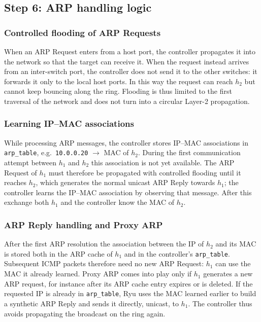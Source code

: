 \documentclass[11pt,a4paper]{article}
\newcommand{\code}[1]{\texttt{#1}}
\begin{document}
\subsection{Step 6: ARP handling logic}
\subsubsection{Controlled flooding of ARP Requests}
When an ARP Request enters from a host port, the controller propagates it into
the network so that the target can receive it. When the request instead arrives
from an inter-switch port, the controller does not send it to the other
switches: it forwards it only to the local host ports. In this way the request
can reach $h_2$ but cannot keep bouncing along the ring. Flooding is thus
limited to the first traversal of the network and does not turn into a circular
Layer-2 propagation.

\subsubsection{Learning IP--MAC associations}
While processing ARP messages, the controller stores IP--MAC associations in
\code{arp\_table}, e.g.\ \code{10.0.0.20} $\to$ MAC of $h_2$. During the first
communication attempt between $h_1$ and $h_2$ this association is not yet
available. The ARP Request of $h_1$ must therefore be propagated with controlled
flooding until it reaches $h_2$, which generates the normal unicast ARP Reply
towards $h_1$; the controller learns the IP--MAC association by observing that
message. After this exchange both $h_1$ and the controller know the MAC of
$h_2$.

\subsubsection{ARP Reply handling and Proxy ARP}
After the first ARP resolution the association between the IP of $h_2$ and its
MAC is stored both in the ARP cache of $h_1$ and in the controller's
\code{arp\_table}. Subsequent ICMP packets therefore need no new ARP Request:
$h_1$ can use the MAC it already learned. Proxy ARP comes into play only if
$h_1$ generates a new ARP request, for instance after its ARP cache entry
expires or is deleted. If the requested IP is already in \code{arp\_table}, Ryu
uses the MAC learned earlier to build a synthetic ARP Reply and sends it
directly, unicast, to $h_1$. The controller thus avoids propagating the
broadcast on the ring again.
\end{document}
